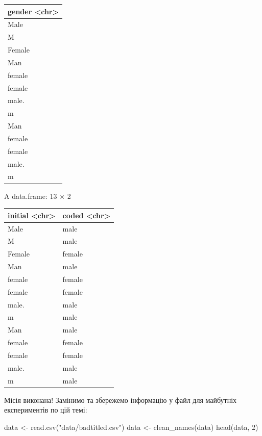\documentclass[
  letterpaper,
  DIV=11,
  numbers=noendperiod]{scrreprt}
\newenvironment{Shaded}{\begin{snugshade}}{\end{snugshade}}
\newcommand{\DecValTok}[1]{\textcolor[rgb]{0.68,0.00,0.00}{#1}}
\newcommand{\FunctionTok}[1]{\textcolor[rgb]{0.28,0.35,0.67}{#1}}
\newcommand{\NormalTok}[1]{\textcolor[rgb]{0.00,0.23,0.31}{#1}}
\newcommand{\OtherTok}[1]{\textcolor[rgb]{0.00,0.23,0.31}{#1}}
\newcommand{\StringTok}[1]{\textcolor[rgb]{0.13,0.47,0.30}{#1}}
\begin{document}
\begin{longtable}[]{@{}l@{}}
\toprule\noalign{}
gender \textless chr\textgreater{} \\
\midrule\noalign{}
\endhead
\bottomrule\noalign{}
\endlastfoot
Male \\
M \\
Female \\
Man \\
female \\
female \\
male. \\
m \\
Man \\
female \\
female \\
male. \\
m \\
\end{longtable}

A data.frame: 13 × 2

\begin{longtable}[]{@{}ll@{}}
\toprule\noalign{}
initial \textless chr\textgreater{} & coded
\textless chr\textgreater{} \\
\midrule\noalign{}
\endhead
\bottomrule\noalign{}
\endlastfoot
Male & male \\
M & male \\
Female & female \\
Man & male \\
female & female \\
female & female \\
male. & male \\
m & male \\
Man & male \\
female & female \\
female & female \\
male. & male \\
m & male \\
\end{longtable}

Місія виконана! Замінимо та збережемо інформацію у файл для майбутніх
експериментів по цій темі:

\begin{Shaded}
\begin{Highlighting}[]
\NormalTok{data }\OtherTok{\textless{}{-}} \FunctionTok{read.csv}\NormalTok{(}\StringTok{"data/badtitled.csv"}\NormalTok{)}
\NormalTok{data }\OtherTok{\textless{}{-}} \FunctionTok{clean\_names}\NormalTok{(data)}
\FunctionTok{head}\NormalTok{(data, }\DecValTok{2}\NormalTok{)}
\end{Highlighting}
\end{Shaded}
\end{document}
